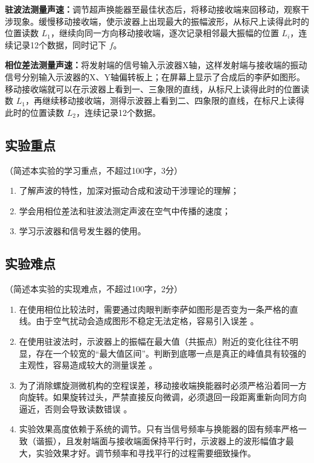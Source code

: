 \documentclass[10pt,a4paper]{ctexart}
\newcommand{\xiaosi}{\fontsize{12pt}{16pt}\selectfont}
\begin{document}
    \textbf{驻波法测量声速：}调节超声换能器至最佳状态后，将移动接收端来回移动，观察干涉现象。缓慢移动接收端，使示波器上出现最大的振幅波形，从标尺上读得此时的位置读数 $L_1$，继续向同一方向移动接收端，逐次记录相邻最大振幅的位置 $L_i$，连续记录12个数据，同时记下 $f$。 
    
    \textbf{相位差法测量声速：}将发射端的信号输入示波器X轴，这样发射端与接收端的振动信号分别输入示波器的X、Y轴偏转板上；在屏幕上显示了合成后的李萨如图形。移动接收端就可以在示波器上看到一、三象限的直线，从标尺上读得此时的位置读数 $L_1$，再继续移动接收端，测得示波器上看到二、四象限的直线，在标尺上读得此时的位置读数 $L_2$，连续记录12个数据。 
    
    \subsection{实验重点}

    \xiaosi（简述本实验的学习重点，不超过100字，3分）


    \begin{enumerate}   
        \item 了解声波的特性，加深对振动合成和波动干涉理论的理解；
        \item 学会用相位差法和驻波法测定声波在空气中传播的速度；
        \item 学习示波器和信号发生器的使用。
    \end{enumerate}  
    
    
    \subsection{实验难点}
    
    \xiaosi（简述本实验的实现难点，不超过100字，2分）

    \begin{enumerate}    
        \item 在使用相位比较法时，需要通过肉眼判断李萨如图形是否变为一条严格的直线。由于空气扰动会造成图形不稳定无法定格，容易引入误差 。
        \item 在使用驻波法时，示波器上的振幅在最大值（共振点）附近的变化往往不明显，存在一个较宽的“最大值区间”。判断到底哪一点是真正的峰值具有较强的主观性，容易造成较大的测量误差 。
        \item 为了消除螺旋测微机构的空程误差，移动接收端换能器时必须严格沿着同一方向旋转。如果旋转过头，严禁直接反向微调，必须退回一段距离重新向同方向逼近，否则会导致读数错误 。
        \item 实验效果高度依赖于系统的调节。只有当信号频率与换能器的固有频率严格一致（谐振），且发射端面与接收端面保持平行时，示波器上的波形幅值才最大，实验效果才好。调节频率和寻找平行的过程需要细致操作。
    \end{enumerate} 
\end{document}
